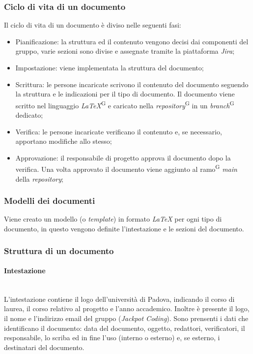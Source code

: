 \documentclass[5pt]{article}
\begin{document}
\subsubsection{Ciclo di vita di un documento} \label{cicloDoc}
Il ciclo di vita di un documento è diviso nelle seguenti fasi:
\begin{itemize}
    \item Pianificazione: la struttura ed il contenuto vengono decisi dai componenti del gruppo, varie sezioni sono divise e assegnate tramite la piattaforma \textit{Jira};
    \item Impostazione: viene implementata la struttura del documento;
    \item Scrittura: le persone incaricate scrivono il contenuto del documento seguendo la struttura e le indicazioni per il tipo di documento. Il documento viene scritto nel linguaggio \textit{LaTeX}\textsuperscript{G} e caricato nella \textit{repository}\textsuperscript{G} in un \textit{branch}\textsuperscript{G} dedicato;
    \item Verifica: le persone incaricate verificano il contenuto e, se necessario, apportano modifiche allo stesso;
    \item Approvazione: il responsabile di progetto approva il documento dopo la verifica. Una volta approvato il documento viene aggiunto al ramo\textsuperscript{G} \textit{main} della \textit{repository};
\end{itemize}

\subsubsection{Modelli dei documenti}
Viene creato un modello (o \textit{template}) in formato \textit{LaTeX} per ogni tipo di documento, in questo vengono definite l'intestazione e le sezioni del documento.

\subsubsection{Struttura di un documento}

\paragraph{Intestazione}~\\
L'intestazione contiene il logo dell'università di Padova, indicando il corso di laurea, il corso relativo al progetto e l'anno accademico. Inoltre è presente il logo, il nome e l'indirizzo email del gruppo (\textit{Jackpot Coding}).
Sono prensenti i dati che identificano il documento: data del documento, oggetto, redattori, verificatori, il responsabile, lo scriba ed in fine l'uso (interno o esterno) e, se esterno, i destinatari del documento.
\end{document}
